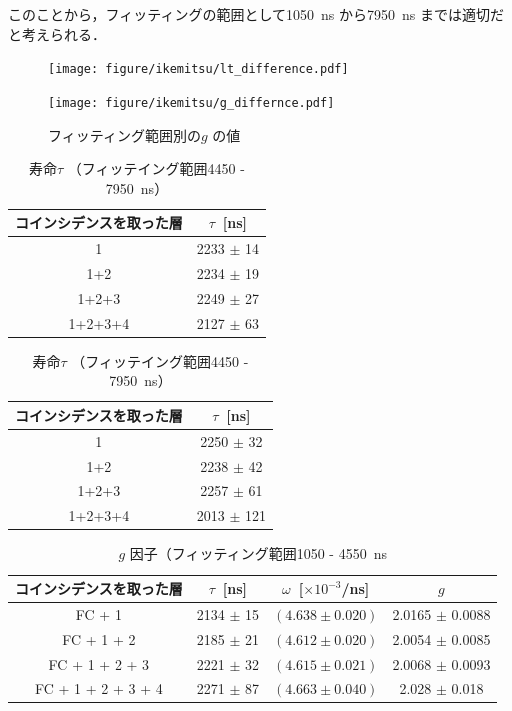このことから，フィッティングの範囲として1050~ns から7950~ns までは適切だと考えられる．

\begin{figure}[H]
\centering
\begin{minipage}{0.4\columnwidth}
\centering
\texttt{[image: figure/ikemitsu/lt\_difference.pdf]}
\caption{フィッティング範囲別の寿命の値}
\label{lt_diff}
\end{minipage}
\begin{minipage}{0.4\columnwidth}
\centering
\texttt{[image: figure/ikemitsu/g\_differnce.pdf]}
\caption{フィッティング範囲別の$g$ の値}
\label{g_diff}
\end{minipage}
\end{figure}
  
\begin{table}[H]
\centering
\begin{minipage}{0.4\columnwidth}
\caption{寿命$\tau$ （フィッティング範囲1050 - 4550~ns） }
\label{fitrange1}
\centering
\begin{tabular}{cc}\toprule
コインシデンスを取った層 & $\tau$~[ns] \\ \midrule
1 & 2233 $\pm$ 14 \\
1+2 & 2234 $\pm$ 19 \\
1+2+3 & 2249 $\pm$ 27 \\
1+2+3+4 & 2127 $\pm$ 63 \\ \bottomrule
\end{tabular}
\end{minipage}
\hspace*{5mm}
\begin{minipage}{0.4\columnwidth}
\caption{寿命$\tau$ （フィッテイング範囲4450 - 7950~ns） }
\label{fitrange2}
\centering
\begin{tabular}{cc}\toprule
コインシデンスを取った層 & $\tau$~[ns] \\ \midrule
1 & 2250 $\pm$ 32 \\
1+2 & 2238 $\pm$ 42 \\
1+2+3 & 2257 $\pm$ 61 \\
1+2+3+4 & 2013 $\pm$ 121 \\ \bottomrule
\end{tabular}
\end{minipage}
\end{table}%

\begin{table}[H]
\caption{$g$ 因子（フィッティング範囲1050 - 4550~ns }
\label{fitrange3}
\centering
\begin{tabular}{cccc}\toprule
コインシデンスを取った層 & $\tau$~[ns] & $\omega$~[$\times 10^{-3}$/ns] & $g$ \\ \midrule
FC + 1 & 2134 $\pm$ 15 & $(4.638 \pm 0.020) $ & 2.0165 $\pm$ 0.0088 \\
FC + 1 + 2 & 2185 $\pm$ 21 & $(4.612 \pm 0.020) $ & 2.0054 $\pm$ 0.0085 \\
FC + 1 + 2 + 3 & 2221 $\pm$ 32 & $(4.615 \pm 0.021) $ & 2.0068 $\pm$ 0.0093\\
FC + 1 + 2 + 3 + 4 & 2271 $\pm$ 87 & $(4.663 \pm 0.040) $ & 2.028 $\pm$ 0.018 \\ \bottomrule
\end{tabular}
\end{table}%

